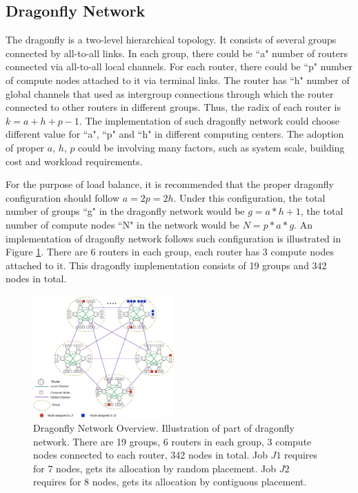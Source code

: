 \documentclass[conference,compsoc]{IEEEtran}
\begin{document}
\subsection{Dragonfly Network}
\label{sec:network}
The dragonfly is a two-level hierarchical topology. It consists of several groups connected by all-to-all links. In each group, there could be ``a" number of routers connected via all-to-all local channels. For each router, there could be ``p" number of compute nodes attached to it via terminal links. The router has ``h" number of global channels that used as intergroup connections through which the router connected to other routers in different groups. Thus, the radix of each router is $k = a+h+p-1$. The implementation of such dragonfly network could choose different value for ``a", ``p" and ``h" in different computing centers. The adoption of proper $a$, $h$, $p$ could be involving many factors, such as system scale, building cost and workload requirements. 

For the purpose of load balance, it is recommended that the proper dragonfly configuration should follow $a=2p=2h$\cite{kim-micro}. Under this configuration, the total number of groups ``g" in the dragonfly network would be $g = a*h+1 $, the total number of compute nodes ``N" in the network would be $N = p*a*g $. An implementation of dragonfly network follows such configuration is illustrated in Figure \ref{fig:dragonfly-overview}. There are 6 routers in each group, each router has 3 compute nodes attached to it. This dragonfly implementation consists of 19 groups and 342 nodes in total.

\begin{figure}[h!] 
  \centering
  \includegraphics[width=0.48\textwidth]{dragonfly-overview}
  \caption{Dragonfly Network Overview. Illustration of part of dragonfly network. There are 19 groups, 6 routers in each group, 3 compute nodes connected to each router, 342 nodes in total. Job $J1$ requires for 7 nodes, gets its allocation by random placement. Job $J2$ requires for 8 nodes, gets its allocation by contiguous placement. }
  \label{fig:dragonfly-overview}
\end{figure}
\end{document}
